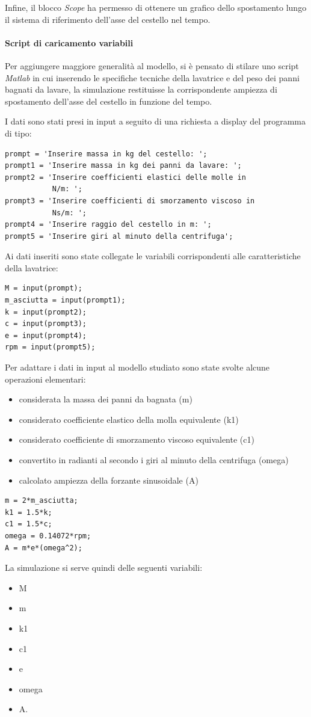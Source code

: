 Infine, il blocco \textit{Scope} ha permesso di ottenere un grafico dello spostamento lungo il sistema di riferimento dell'asse del cestello nel tempo.
\paragraph{Script di caricamento variabili} Per aggiungere maggiore generalità al modello, si è pensato di stilare uno script \textit{Matlab} in cui inserendo le specifiche tecniche della lavatrice e del peso dei panni bagnati da lavare, la simulazione restituisse la corrispondente ampiezza di spostamento dell'asse del cestello in funzione del tempo. 

I dati sono stati presi in input a seguito di una richiesta a display del programma di tipo:
\begin{lstlisting}[frame=trBL]
prompt = 'Inserire massa in kg del cestello: ';
prompt1 = 'Inserire massa in kg dei panni da lavare: ';
prompt2 = 'Inserire coefficienti elastici delle molle in
           N/m: ';
prompt3 = 'Inserire coefficienti di smorzamento viscoso in
           Ns/m: ';
prompt4 = 'Inserire raggio del cestello in m: ';
prompt5 = 'Inserire giri al minuto della centrifuga';
\end{lstlisting}
Ai dati inseriti sono state collegate le variabili corrispondenti alle caratteristiche della lavatrice:
\begin{lstlisting}[frame=trBL]
M = input(prompt);
m_asciutta = input(prompt1);
k = input(prompt2);
c = input(prompt3);
e = input(prompt4);
rpm = input(prompt5);
\end{lstlisting}
Per adattare i dati in input al modello studiato sono state svolte alcune operazioni elementari:
\begin{itemize}
    \item considerata la massa dei panni da bagnata (m)
    \item considerato coefficiente elastico della molla equivalente (k1)
    \item considerato coefficiente di smorzamento viscoso equivalente (c1)
    \item convertito in radianti al secondo i giri al minuto della centrifuga (omega)
    \item calcolato ampiezza della forzante sinusoidale (A) 
\end{itemize}

\begin{lstlisting}[frame=trBL]
m = 2*m_asciutta;
k1 = 1.5*k;
c1 = 1.5*c;
omega = 0.14072*rpm;
A = m*e*(omega^2);
\end{lstlisting}
La simulazione si serve quindi delle seguenti variabili:
\begin{itemize}
    \item M
    \item m
    \item k1
    \item c1
    \item e
    \item omega
    \item A.
\end{itemize}

